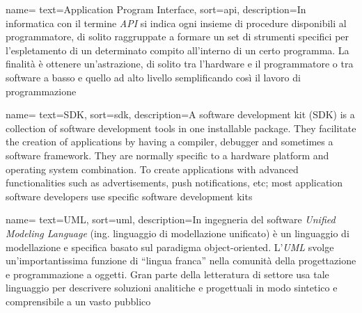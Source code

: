 



 {
    name=
    text=Application Program Interface,
    sort=api,
    description={In informatica con il termine \emph{API} si indica ogni insieme di procedure disponibili al programmatore, di solito raggruppate a formare un set di strumenti specifici per l'espletamento di un determinato compito all'interno di un certo programma. La finalità è ottenere un'astrazione, di solito tra l'hardware e il programmatore o tra software a basso e quello ad alto livello semplificando così il lavoro di programmazione}
}

 {
    name=
    text=SDK,
    sort=sdk,
    description={A software development kit (SDK) is a collection of software development tools in one installable package. They facilitate the creation of applications by having a compiler, debugger and sometimes a software framework. They are normally specific to a hardware platform and operating system combination. To create applications with advanced functionalities such as advertisements, push notifications, etc; most application software developers use specific software development kits}
}

 {
    name=
    text=UML,
    sort=uml,
    description={In ingegneria del software \emph{Unified Modeling Language} (ing. linguaggio di modellazione unificato) è un linguaggio di modellazione e specifica basato sul paradigma object-oriented. L'\emph{UML} svolge un'importantissima funzione di ``lingua franca'' nella comunità della progettazione e programmazione a oggetti. Gran parte della letteratura di settore usa tale linguaggio per descrivere soluzioni analitiche e progettuali in modo sintetico e comprensibile a un vasto pubblico}
}